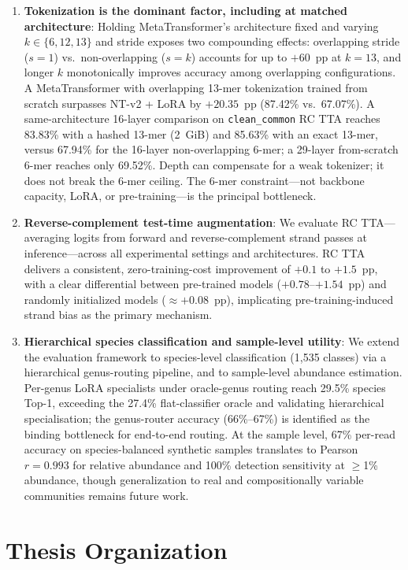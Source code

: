\begin{enumerate}
    \item \textbf{Tokenization is the dominant factor, including at matched architecture}: Holding MetaTransformer's architecture fixed and varying $k \in \{6, 12, 13\}$ and stride exposes two compounding effects: overlapping stride ($s{=}1$) vs.\ non-overlapping ($s{=}k$) accounts for up to $+60$~pp at $k{=}13$, and longer $k$ monotonically improves accuracy among overlapping configurations. A MetaTransformer with overlapping 13-mer tokenization trained from scratch surpasses NT-v2 + LoRA by $+20.35$~pp (87.42\% vs.\ 67.07\%). A same-architecture 16-layer comparison on \texttt{clean\_common} RC TTA reaches 83.83\% with a hashed 13-mer (2~GiB) and 85.63\% with an exact 13-mer, versus 67.94\% for the 16-layer non-overlapping 6-mer; a 29-layer from-scratch 6-mer reaches only 69.52\%. Depth can compensate for a weak tokenizer; it does not break the 6-mer ceiling. The 6-mer constraint---not backbone capacity, LoRA, or pre-training---is the principal bottleneck.

    \item \textbf{Reverse-complement test-time augmentation}: We evaluate RC TTA---averaging logits from forward and reverse-complement strand passes at inference---across all experimental settings and architectures. RC TTA delivers a consistent, zero-training-cost improvement of $+0.1$ to $+1.5$~pp, with a clear differential between pre-trained models ($+0.78$--$+1.54$~pp) and randomly initialized models ($\approx$$+0.08$~pp), implicating pre-training-induced strand bias as the primary mechanism.

    \item \textbf{Hierarchical species classification and sample-level utility}: We extend the evaluation framework to species-level classification (1,535 classes) via a hierarchical genus-routing pipeline, and to sample-level abundance estimation. Per-genus LoRA specialists under oracle-genus routing reach 29.5\% species Top-1, exceeding the 27.4\% flat-classifier oracle and validating hierarchical specialisation; the genus-router accuracy (66\%--67\%) is identified as the binding bottleneck for end-to-end routing. At the sample level, 67\% per-read accuracy on species-balanced synthetic samples translates to Pearson $r = 0.993$ for relative abundance and 100\% detection sensitivity at $\geq$1\% abundance, though generalization to real and compositionally variable communities remains future work.
\end{enumerate}

\section{Thesis Organization}
\label{sec:intro-organization}


